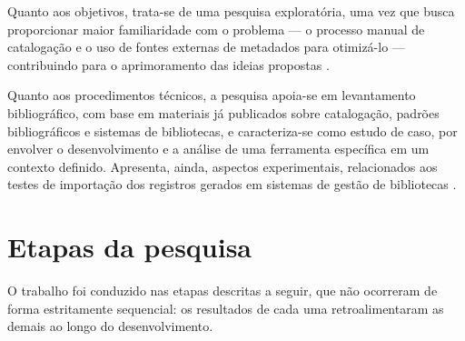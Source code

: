 Quanto aos objetivos, trata-se de uma pesquisa exploratória, uma vez que busca proporcionar maior familiaridade com o problema --- o processo manual de catalogação e o uso de fontes externas de metadados para otimizá-lo --- contribuindo para o aprimoramento das ideias propostas \cite{gil2008,prodanov2013}.

Quanto aos procedimentos técnicos, a pesquisa apoia-se em levantamento bibliográfico, com base em materiais já publicados sobre catalogação, padrões bibliográficos e sistemas de bibliotecas, e caracteriza-se como estudo de caso, por envolver o desenvolvimento e a análise de uma ferramenta específica em um contexto definido. Apresenta, ainda, aspectos experimentais, relacionados aos testes de importação dos registros gerados em sistemas de gestão de bibliotecas \cite{gil2008}.

\section{Etapas da pesquisa}
\label{sec:etapas}

O trabalho foi conduzido nas etapas descritas a seguir, que não ocorreram de forma estritamente sequencial: os resultados de cada uma retroalimentaram as demais ao longo do desenvolvimento.


